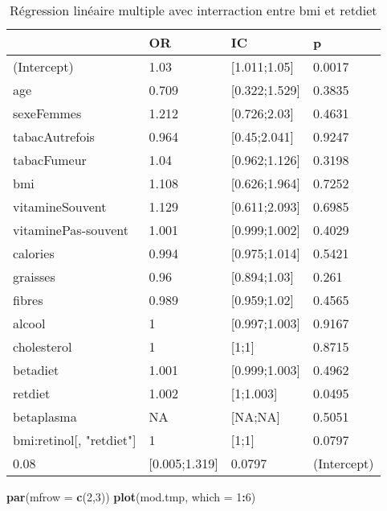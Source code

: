 \documentclass[]{article}
\newenvironment{Shaded}{\begin{snugshade}}{\end{snugshade}}
\newcommand{\KeywordTok}[1]{\textcolor[rgb]{0.13,0.29,0.53}{\textbf{#1}}}
\newcommand{\DataTypeTok}[1]{\textcolor[rgb]{0.13,0.29,0.53}{#1}}
\newcommand{\DecValTok}[1]{\textcolor[rgb]{0.00,0.00,0.81}{#1}}
\newcommand{\OperatorTok}[1]{\textcolor[rgb]{0.81,0.36,0.00}{\textbf{#1}}}
\newcommand{\NormalTok}[1]{#1}
\begin{document}
\begin{table}

\caption{\label{tab:unnamed-chunk-86}Régression linéaire multiple avec interraction entre bmi et retdiet}
\centering
\begin{tabular}[t]{l|l|l|l}
\hline
  & OR & IC & p\\
\hline
\rowcolor[HTML]{BBD2E1}  (Intercept) & 1.03 & [1.011;1.05] & 0.0017\\
\hline
age & 0.709 & [0.322;1.529] & 0.3835\\
\hline
\rowcolor[HTML]{BBD2E1}  sexeFemmes & 1.212 & [0.726;2.03] & 0.4631\\
\hline
tabacAutrefois & 0.964 & [0.45;2.041] & 0.9247\\
\hline
\rowcolor[HTML]{BBD2E1}  tabacFumeur & 1.04 & [0.962;1.126] & 0.3198\\
\hline
bmi & 1.108 & [0.626;1.964] & 0.7252\\
\hline
\rowcolor[HTML]{BBD2E1}  vitamineSouvent & 1.129 & [0.611;2.093] & 0.6985\\
\hline
vitaminePas-souvent & 1.001 & [0.999;1.002] & 0.4029\\
\hline
\rowcolor[HTML]{BBD2E1}  calories & 0.994 & [0.975;1.014] & 0.5421\\
\hline
graisses & 0.96 & [0.894;1.03] & 0.261\\
\hline
\rowcolor[HTML]{BBD2E1}  fibres & 0.989 & [0.959;1.02] & 0.4565\\
\hline
alcool & 1 & [0.997;1.003] & 0.9167\\
\hline
\rowcolor[HTML]{BBD2E1}  cholesterol & 1 & [1;1] & 0.8715\\
\hline
betadiet & 1.001 & [0.999;1.003] & 0.4962\\
\hline
\rowcolor[HTML]{BBD2E1}  retdiet & 1.002 & [1;1.003] & 0.0495\\
\hline
betaplasma & NA & [NA;NA] & 0.5051\\
\hline
\rowcolor[HTML]{BBD2E1}  bmi:retinol[, "retdiet"] & 1 & [1;1] & 0.0797\\
\hline
0.08 & [0.005;1.319] & 0.0797 & (Intercept)\\
\hline
\end{tabular}
\end{table}

\begin{Shaded}
\begin{Highlighting}[]
\KeywordTok{par}\NormalTok{(}\DataTypeTok{mfrow =} \KeywordTok{c}\NormalTok{(}\DecValTok{2}\NormalTok{,}\DecValTok{3}\NormalTok{))}
\KeywordTok{plot}\NormalTok{(mod.tmp, }\DataTypeTok{which =} \DecValTok{1}\OperatorTok{:}\DecValTok{6}\NormalTok{)}
\end{Highlighting}
\end{Shaded}
\end{document}
